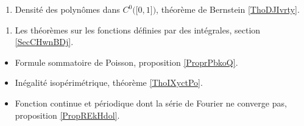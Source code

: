 \begin{enumerate}
    \item 
        Densité des polynômes dans \( C^0\big( \mathopen[ 0 , 1 \mathclose] \big)\), théorème de Bernstein \ref{ThoDJIvrty}.
\end{enumerate}

\begin{enumerate}
    \item 
        Les théorèmes sur les fonctions définies par des intégrales, section \ref{SecCHwnBDj}.
\end{enumerate}

\begin{itemize}
    \item Formule sommatoire de Poisson, proposition \ref{ProprPbkoQ}.
    \item Inégalité isopérimétrique, théorème \ref{ThoIXyctPo}.
    \item Fonction continue et périodique dont la série de Fourier ne converge pas, proposition \ref{PropREkHdol}.
\end{itemize}
